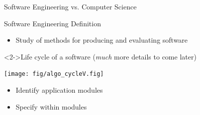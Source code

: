 \begin{frame}{Software Engineering vs. Computer Science}

  \begin{block}{Software Engineering Definition}
    \begin{itemize}
    \item Study of methods for producing and evaluating software
    \end{itemize}
  \end{block}
  
  \begin{block}<2->{Life cycle of a software
      {\color{black}\normalsize (\textit{much} more details to come later)}}\medskip
    \centerline{\texttt{[image: fig/algo\_cycleV.fig]}}
    \begin{itemize}
    \item {} Identify application modules
    \item {} Specify within modules
    \end{itemize}
  \end{block}
\end{frame}
